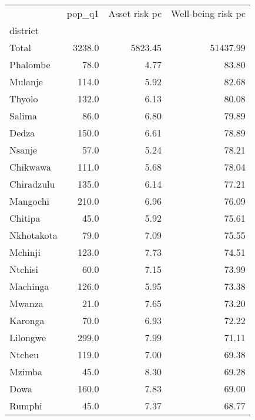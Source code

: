 \begin{tabular}{lrrr}
\toprule
{} &  pop\_q1 &  Asset risk pc &  Well-being risk pc \\
district       &         &                &                     \\
\midrule
Total          &  3238.0 &        5823.45 &            51437.99 \\
Phalombe       &    78.0 &           4.77 &               83.80 \\
Mulanje        &   114.0 &           5.92 &               82.68 \\
Thyolo         &   132.0 &           6.13 &               80.08 \\
Salima         &    86.0 &           6.80 &               79.89 \\
Dedza          &   150.0 &           6.61 &               78.89 \\
Nsanje         &    57.0 &           5.24 &               78.21 \\
Chikwawa       &   111.0 &           5.68 &               78.04 \\
Chiradzulu     &   135.0 &           6.14 &               77.21 \\
Mangochi       &   210.0 &           6.96 &               76.09 \\
Chitipa        &    45.0 &           5.92 &               75.61 \\
Nkhotakota     &    79.0 &           7.09 &               75.55 \\
Mchinji        &   123.0 &           7.73 &               74.51 \\
Ntchisi        &    60.0 &           7.15 &               73.99 \\
Machinga       &   126.0 &           5.95 &               73.38 \\
Mwanza         &    21.0 &           7.65 &               73.20 \\
Karonga        &    70.0 &           6.93 &               72.22 \\
Lilongwe       &   299.0 &           7.99 &               71.11 \\
Ntcheu         &   119.0 &           7.00 &               69.38 \\
Mzimba         &    45.0 &           8.30 &               69.28 \\
Dowa           &   160.0 &           7.83 &               69.00 \\
Rumphi         &    45.0 &           7.37 &               68.77 \\

\end{tabular}
